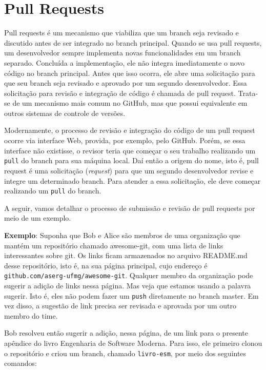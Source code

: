 \documentclass[
  11pt,
  twoside]{book}
\newcommand{\passthrough}[1]{#1}
\begin{document}
\hypertarget{pull-requests}{%
\section{Pull Requests}\label{pull-requests}}

  

Pull requests é um mecanismo que viabiliza que um branch seja revisado e
discutido antes de ser integrado no branch principal. Quando se usa pull
requests, um desenvolvedor sempre implementa novas funcionalidades em um
branch separado. Concluída a implementação, ele não integra
imediatamente o novo código no branch principal. Antes que isso ocorra,
ele abre uma solicitação para que seu branch seja revisado e aprovado
por um segundo desenvolvedor. Essa solicitação para revisão e integração
de código é chamada de pull request. Trata-se de um mecanismo mais comum
no GitHub, mas que possui equivalente em outros sistemas de controle de
versões.

Modernamente, o processo de revisão e integração do código de um pull
request ocorre via interface Web, provida, por exemplo, pelo GitHub.
Porém, se essa interface não existisse, o revisor teria que começar o
seu trabalho realizando um \passthrough{\lstinline!pull!} do branch para
sua máquina local. Daí então a origem do nome, isto é, pull request é
uma solicitação (\emph{request}) para que um segundo desenvolvedor
revise e integre um determinado branch. Para atender a essa solicitação,
ele deve começar realizando um \passthrough{\lstinline!pull!} do branch.

A seguir, vamos detalhar o processo de submissão e revisão de pull
requests por meio de um exemplo.

\textbf{Exemplo}: Suponha que Bob e Alice são membros de uma organização
que mantém um repositório chamado awesome-git, com uma lista de links
interessantes sobre git. Os links ficam armazenados no arquivo README.md
desse repositório, isto é, na sua página principal, cujo endereço é
\passthrough{\lstinline!github.com/aserg-ufmg/awesome-git!}. Qualquer
membro da organização pode sugerir a adição de links nessa página. Mas
veja que estamos usando a palavra sugerir. Isto é, eles não podem fazer
um \passthrough{\lstinline!push!} diretamente no branch master. Em vez
disso, a sugestão de link precisa ser revisada e aprovada por um outro
membro do time.

Bob resolveu então sugerir a adição, nessa página, de um link para o
presente apêndice do livro Engenharia de Software Moderna. Para isso,
ele primeiro clonou o repositório e criou um branch, chamado
\passthrough{\lstinline!livro-esm!}, por meio dos seguintes comandos:
\end{document}
